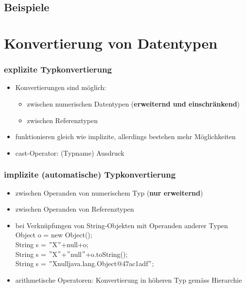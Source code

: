 \documentclass[a4paper,10pt]{article}
\newcommand{\Bold}[1]{\textbf{#1}} %
\begin{document}
\subsection{Beispiele}

\pagebreak



\newpage
\section{Konvertierung von Datentypen}

\subsubsection{explizite Typkonvertierung}
\begin{itemize}
	\item Konvertierungen sind m\"oglich:
		\begin{itemize}
			\item zwischen numerischen Datentypen (\Bold {erweiternd und einschr\"ankend})
			\item zwischen Referenztypen
		\end{itemize}
	\item funktionieren gleich wie implizite, allerdings bestehen mehr M\"oglichkeiten
	\item cast-Operator: (Typname) Ausdruck
\end{itemize}

\subsubsection{implizite (automatische) Typkonvertierung}
\begin{itemize}
	\item zwischen Operanden von numerischem Typ (\Bold {nur erweiternd})
	\item zwischen Operanden von Referenztypen
	\item bei Verkn\"upfungen von String-Objekten mit Operanden anderer Typen \\
			    Object o = new Object();\\
			    String s = $"$X$"$+null+o;\\
			   String s = $"$X$"$+$"$null$"$+o.toString();\\
                                   String s = $"$Xnulljava.lang.Object@47ac1adf$"$;
	\item arithmetische Operatoren: Konvertierung in h\"oheren Typ gem\"ass Hierarchie
\end{itemize}
\end{document}
